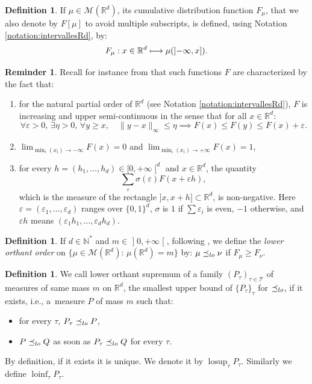 \documentclass[11pt]{article}
\newcommand{\ie}{i.e.,\xspace}
\newcommand\mto{\mathchoice{\longmapsto}{\mapsto}{\mapsto}{\mapsto}}
\theoremstyle{plain}
\theoremstyle{definition}
\newtheorem{defi}[them]{Definition}
\newtheorem{reminder}[them]{Reminder}
\newcommand{\Tt}{{\mathcal T}}
\let\eps\varepsilon
\newcommand{\m}{\mathcal{M}}
\newcommand{\R}{\mathbb{R}}
\newcommand{\N}{\mathbb{N}}
\newcommand{\lcsup}{\operatorname{losup}}
\newcommand{\lcinf}{\operatorname{loinf}}
\newcommand{\op}{\mathopen}
\newcommand{\clo}{\mathclose}
\newcommand{\leqlc}{\preceq_{\rm lo}}
\begin{document}
\begin{defi}\label{def:cumul}
If $\mu\in\m(\R^d)$, its cumulative distribution function $F_\mu$, that we also denote by $F[\mu]$ to avoid multiple subscripts, is defined, using Notation \ref{notation:intervallesRd}, by:
\[F_\mu:x\in\R^d\mto\mu(\op]-\infty,x]).\]
\end{defi}

\begin{reminder}\label{remind:F}
Recall for instance from \cite[Th.\,3.25]{Kal} that such functions $F$ are characterized by the fact that:
\begin{enumerate}
\item
\label{item:Fonctions_partielles} for the natural partial order of $\R^d$ (see Notation \ref{notation:intervallesRd}), $F$ is increasing and upper semi-continuous in the sense that for all $x\in\R^d$:
\begin{equation}\label{eq:usc}
\forall\varepsilon>0,\,\exists\eta>0,\,\forall y\geqslant x,\quad \|y-x\|_\infty\leqslant\eta\implies F(x)\leqslant F(y)\leqslant F(x)+\varepsilon.
\end{equation}

\item
\label{item:Flimite} $\lim_{\min_i(x_i)\to-\infty} F(x)=0$ and $\lim_{\min_i(x_i)\to+\infty} F(x)=1$,

\item
\label{item:Fdifferences_croisees} for every $h=(h_1,\ldots,h_d)\in[0,+\infty\clo[^d$ and $x
\in \R^d$, the quantity
\[
\sum_{\eps} \sigma(\eps) F(x+\eps h),
\]
which is the measure of the rectangle $]x,x+h]\subset \R^d$, is non-negative. Here $\eps=(\eps_1,\ldots,\eps_d)$ ranges over $\{0,1\}^d$, $\sigma$ is $1$ if $\sum \eps_i$ is even, $-1$ otherwise, and $\eps h$ means $(\eps_1h_1,\ldots,\eps_dh_d)$.
\end{enumerate}
\end{reminder}

\begin{defi}\label{defi:geqlc} If $d\in\N^\ast$ and $m\in\op]0,+\infty\clo[$, following \cite[\S 6.G]{SS}, we define the \emph{lower orthant order} on $\{\mu\in\m(\R^d):\,\mu(\R^d)=m\}$ by: $\mu\leqlc\nu$ if $F_\mu\geqslant F_\nu$.
\end{defi}

\begin{defi}\label{def:lcsup}We call lower orthant supremum of a family $(P_\tau)_{\tau\in\Tt}$ of measures of same mass $m$ on $\R^d$, the smallest upper bound of $\{P_\tau\} _\tau$ for $\leqlc$, if it exists, \ie a~measure $P$ of mass $m$ such that:
\begin{itemize}
\item
for every $\tau$, $P_\tau\leqlc P$,
\item
$P\leqlc Q$ as soon as $P_\tau\leqlc Q$ for every $\tau$.
\end{itemize}
By definition, if it exists it is unique. We denote it by $\lcsup_\tau P_\tau$. Similarly we define $\lcinf_\tau P_\tau$.
\end{defi}
\end{document}
